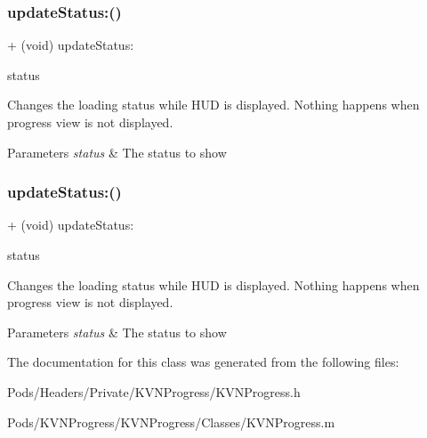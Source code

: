 \subsubsection{\texorpdfstring{update\+Status\+:()}{updateStatus:()}\hspace{0.1cm}{\footnotesize\ttfamily [2/3]}}
{\footnotesize\ttfamily + (void) update\+Status\+: \begin{DoxyParamCaption}\item[{(N\+S\+String $\ast$)}]{status }\end{DoxyParamCaption}}

Changes the loading status while H\+UD is displayed. Nothing happens when progress view is not displayed. 
\begin{DoxyParams}{Parameters}
{\em status} & The status to show \\
\hline
\end{DoxyParams}
\mbox{\label{interface_k_v_n_progress_ab50b37330761d25ce8b261290537da1a}} 
\subsubsection{\texorpdfstring{update\+Status\+:()}{updateStatus:()}\hspace{0.1cm}{\footnotesize\ttfamily [3/3]}}
{\footnotesize\ttfamily + (void) update\+Status\+: \begin{DoxyParamCaption}\item[{(N\+S\+String$\ast$)}]{status }\end{DoxyParamCaption}}

Changes the loading status while H\+UD is displayed. Nothing happens when progress view is not displayed. 
\begin{DoxyParams}{Parameters}
{\em status} & The status to show \\
\hline
\end{DoxyParams}


The documentation for this class was generated from the following files\+:\begin{DoxyCompactItemize}
\item 
Pods/\+Headers/\+Private/\+K\+V\+N\+Progress/K\+V\+N\+Progress.\+h\item 
Pods/\+K\+V\+N\+Progress/\+K\+V\+N\+Progress/\+Classes/K\+V\+N\+Progress.\+m\end{DoxyCompactItemize}
